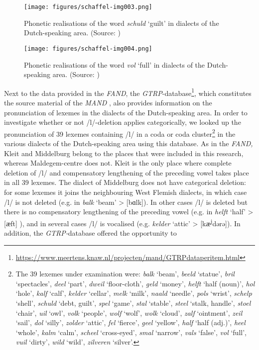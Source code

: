 \documentclass[output=paper,hidelinks,draftmode]{langscibook}
\begin{document}
\begin{figure}[t]
\caption{Phonetic realisations of the word \textit{schuld} ‘guilt’ in dialects of the Dutch-speaking area. (Source: \citealt{DeWulfTaeldeman2005})}
	\label{fig:schaffel:3}
\texttt{[image: figures/schaffel-img003.png]}
\end{figure}


\begin{figure}[t]
\caption{Phonetic realisations of the word \textit{vol} ‘full’ in dialects of the Dutch-speaking area. (Source: \citealt{DeWulfTaeldeman2005})}
\label{fig:schaffel:4a}
\texttt{[image: figures/schaffel-img004.png]}
\end{figure}

\largerpage[-1]
Next to the data provided in the \textit{FAND}, the \textit{GTRP}{}-database\footnote{ \url{https://www.meertens.knaw.nl/projecten/mand/GTRPdataperitem.html}}, which constitutes the source material of the \textit{MAND} \citep{DeSchutterJong2005}, also provides information on the pronunciation of lexemes in the dialects of the Dutch-speaking area. In order to investigate whether or not /l/-deletion applies categorically, we looked up the pronunciation of 39 lexemes containing /l/ in a coda or coda cluster\footnote{ {The 39 lexemes under examination were:} {\textit{balk} }{‘beam’,} {\textit{beeld} }{‘statue’,} {\textit{bril} }{‘spectacles’,} {\textit{deel} }{‘part’,} {\textit{dweil} }{‘floor-cloth’,} {\textit{geld} }{‘money’,} {\textit{helft}} {‘half (noun)’,} {\textit{hol} }{‘hole’,} {\textit{kalf} }{‘calf’,} {\textit{kelder} }{‘cellar’,} {\textit{melk} }{‘milk’,} {\textit{naald} }{‘needle’,} {\textit{pols} }{‘wrist’,} {\textit{schelp} }{‘shell’,} {\textit{schuld} }{‘debt, guilt’,} {\textit{spel} }{‘game’,} {\textit{stal} }{‘stable’,} {\textit{steel} }{‘stalk, handle’,} {\textit{stoel} }{‘chair’,} {\textit{uil} }{‘owl’,} {\textit{volk} }{‘people’,} {\textit{wolf} }{‘wolf’,} {\textit{wolk} }{‘cloud’,} {\textit{zalf} }{‘ointment’,} {\textit{zeil} }{‘sail’,} {\textit{dol} }{‘silly’,} {\textit{zolder} }{‘attic’,} {\textit{fel} }{‘fierce’,} {\textit{geel} }{‘yellow’,} {\textit{half} }{‘half (adj.)’,} {\textit{heel} }{‘whole’,} {\textit{kalm} }{‘calm’,} {\textit{scheel} }{‘cross-eyed’,} {\textit{smal}} {‘narrow’,} {\textit{vals} }{‘false’,} {\textit{vol} }{‘full’,} {\textit{vuil} }{‘dirty’,} {\textit{wild} }{‘wild’,} {\textit{zilveren} }{‘silver’.}} in the various dialects of the Dutch-speaking area using this database. As in the \textit{FAND,} Kleit and Middelburg belong to the places that were included in this research, whereas Maldegem-centre does not. Kleit is the only place where complete deletion of /l/ and compensatory lengthening of the preceding vowel takes place in all 39 lexemes. The dialect of Middelburg does not have categorical deletion: for some lexemes it joins the neighbouring West Flemish dialects, in which case /l/ is not deleted (e.g. in \textit{balk} ‘beam’ > [bɑlk]). In other cases /l/ is deleted but there is no compensatory lengthening of the preceding vowel (e.g. in \textit{helft} ‘half’ > [{ӕft}] ), and in several cases /l/ is vocalised (e.g. \textit{kelder} ‘attic’ > [k{ӕ}\textsuperscript{j}dərə]). In addition, the \textit{GTRP-}database offered the opportunity to 
\end{document}
